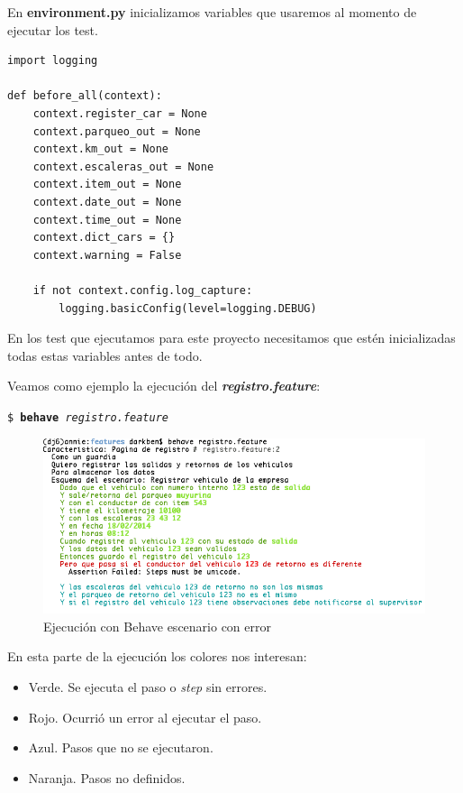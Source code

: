 En {\bfseries environment.py} inicializamos variables que usaremos al momento de
ejecutar los test.

\begin{verbatim}
import logging

def before_all(context):
    context.register_car = None
    context.parqueo_out = None
    context.km_out = None
    context.escaleras_out = None
    context.item_out = None
    context.date_out = None
    context.time_out = None
    context.dict_cars = {}
    context.warning = False

    if not context.config.log_capture:
        logging.basicConfig(level=logging.DEBUG)
\end{verbatim}

En los test que ejecutamos para este proyecto necesitamos que estén inicializadas
todas estas variables antes de todo.

Veamos como ejemplo la ejecución del {\it{\bfseries registro.feature}}:

\texttt{\$ {\bfseries behave} \emph{registro.feature}}

\begin{figure}[h]
  \begin{center}
  \includegraphics[width=1.1\textwidth]{figures/chapter4/behave_registro.png}
  \caption[Ejecución con Behave con error]{Ejecución con Behave escenario con error}
\end{center}
\end{figure}

En esta parte de la ejecución los colores nos interesan:

\begin{itemize}
  \item Verde. Se ejecuta el paso o {\it step} sin errores.
    \item Rojo. Ocurrió un error al ejecutar el paso.
    \item Azul. Pasos que no se ejecutaron.
    \item Naranja. Pasos no definidos.
\end{itemize}

